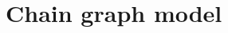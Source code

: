 \documentclass[12pt]{article}
\newcommand{\yc}[1]{\textcolor{red}{#1}}
\newcommand{\1}{\uppercase\expandafter{\romannumeral1}}
\newcommand{\2}{\uppercase\expandafter{\romannumeral2}}
\newcommand{\0}{\textbf{0}}
\begin{document}





\section{Chain graph model}\label{sec:model}
\end{document}

